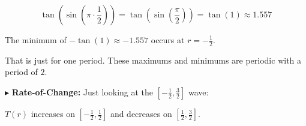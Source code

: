 \documentclass{ximera}
\begin{document}
\[   \tan\left(\sin\left(\pi \cdot \frac{1}{2}\right)\right)  =   \tan\left(\sin\left(\frac{\pi}{2}\right)\right)  = \tan(1)  \approx 1.557  \]


The minimum of $-\tan(1) \approx -1.557$ occurs at $r = -\frac{1}{2}$.


That is just for one period. These maximums and minimums are periodic with a period of $2$.






$\blacktriangleright$ \textbf{Rate-of-Change:}  Just looking at the $\left[ -\frac{1}{2}, \frac{3}{2} \right]$ wave:

$T(r)$ increases on $\left[ -\frac{1}{2}, \frac{1}{2} \right]$ and decreases on $\left[\frac{1}{2}, \frac{3}{2} \right]$.
\end{document}
